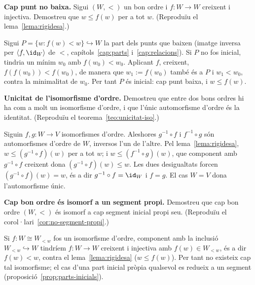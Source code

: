 \begin{exercici}
\textbf{Cap punt no baixa.} Sigui \((W,<)\) un bon ordre i \(f\colon W\to W\) creixent i injectiva. Demostreu que \(w\le f(w)\) per a tot \(w\). (Reproduïu el lema~\ref{lema:rigidesa}.)
\end{exercici}
\begin{solucio}
Sigui \(P=\{w : f(w)<w\}\hookrightarrow W\) la part dels punts que baixen (imatge inversa per \(\langle f,\id_W\rangle\) de \({<}\), capítols~\ref{cap:parts} i~\ref{cap:relacions}). Si \(P\) no fos inicial, tindria un mínim \(w_0\) amb \(f(w_0)<w_0\). Aplicant \(f\), creixent, \(f(f(w_0))<f(w_0)\), de manera que \(w_1:=f(w_0)\) també és a \(P\) i \(w_1<w_0\), contra la minimalitat de \(w_0\). Per tant \(P\) és inicial: cap punt baixa, i \(w\le f(w)\).
\end{solucio}

\begin{exercici}
\textbf{Unicitat de l'isomorfisme d'ordre.} Demostreu que entre dos bons ordres hi ha com a molt un isomorfisme d'ordre, i que l'únic automorfisme d'ordre és la identitat. (Reproduïu el teorema~\ref{teo:unicitat-iso}.)
\end{exercici}
\begin{solucio}
Siguin \(f,g\colon W\to V\) isomorfismes d'ordre. Aleshores \(g^{-1}\circ f\) i \(f^{-1}\circ g\) són automorfismes d'ordre de \(W\), inversos l'un de l'altre. Pel lema~\ref{lema:rigidesa}, \(w\le(g^{-1}\circ f)(w)\) per a tot \(w\); i \(w\le(f^{-1}\circ g)(w)\), que component amb \(g^{-1}\circ f\) creixent dona \((g^{-1}\circ f)(w)\le w\). Les dues desigualtats forcen \((g^{-1}\circ f)(w)=w\), és a dir \(g^{-1}\circ f=\id_W\) i \(f=g\). El cas \(W=V\) dona l'automorfisme únic.
\end{solucio}

\begin{exercici}
\textbf{Cap bon ordre és isomorf a un segment propi.} Demostreu que cap bon ordre \((W,<)\) és isomorf a cap segment inicial propi seu. (Reproduïu el corol·lari~\ref{cor:no-segment-propi}.)
\end{exercici}
\begin{solucio}
Si \(f\colon W\cong W_{<w}\) fos un isomorfisme d'ordre, component amb la inclusió \(W_{<w}\hookrightarrow W\) tindríem \(f\colon W\to W\) creixent i injectiva amb \(f(w)\in W_{<w}\), és a dir \(f(w)<w\), contra el lema~\ref{lema:rigidesa} (\(w\le f(w)\)). Per tant no existeix cap tal isomorfisme; el cas d'una part inicial pròpia qualsevol es redueix a un segment (proposició~\ref{prop:parts-inicials}).
\end{solucio}

